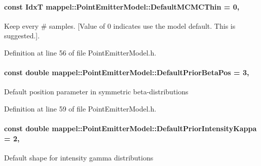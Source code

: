 \paragraph[{\texorpdfstring{Default\+M\+C\+M\+C\+Thin}{DefaultMCMCThin}}]{\setlength{\rightskip}{0pt plus 5cm}const {\bf IdxT} mappel\+::\+Point\+Emitter\+Model\+::\+Default\+M\+C\+M\+C\+Thin = 0\hspace{0.3cm}{\ttfamily [static]}, {\ttfamily [inherited]}}\hypertarget{classmappel_1_1PointEmitterModel_aac243ab7c6862c3d9ce3af8ca8a17e6c}{}\label{classmappel_1_1PointEmitterModel_aac243ab7c6862c3d9ce3af8ca8a17e6c}


Keep every \# samples. \mbox{[}Value of 0 indicates use the model default. This is suggested.\mbox{]}. 



Definition at line 56 of file Point\+Emitter\+Model.\+h.

\paragraph[{\texorpdfstring{Default\+Prior\+Beta\+Pos}{DefaultPriorBetaPos}}]{\setlength{\rightskip}{0pt plus 5cm}const double mappel\+::\+Point\+Emitter\+Model\+::\+Default\+Prior\+Beta\+Pos = 3\hspace{0.3cm}{\ttfamily [static]}, {\ttfamily [inherited]}}\hypertarget{classmappel_1_1PointEmitterModel_a2771dc4415f351862619cd9671b5310d}{}\label{classmappel_1_1PointEmitterModel_a2771dc4415f351862619cd9671b5310d}
Default position parameter in symmetric beta-\/distributions 

Definition at line 59 of file Point\+Emitter\+Model.\+h.

\paragraph[{\texorpdfstring{Default\+Prior\+Intensity\+Kappa}{DefaultPriorIntensityKappa}}]{\setlength{\rightskip}{0pt plus 5cm}const double mappel\+::\+Point\+Emitter\+Model\+::\+Default\+Prior\+Intensity\+Kappa = 2\hspace{0.3cm}{\ttfamily [static]}, {\ttfamily [inherited]}}\hypertarget{classmappel_1_1PointEmitterModel_a03d9f90c130df2d42d0d31c9337e914c}{}\label{classmappel_1_1PointEmitterModel_a03d9f90c130df2d42d0d31c9337e914c}
Default shape for intensity gamma distributions 

